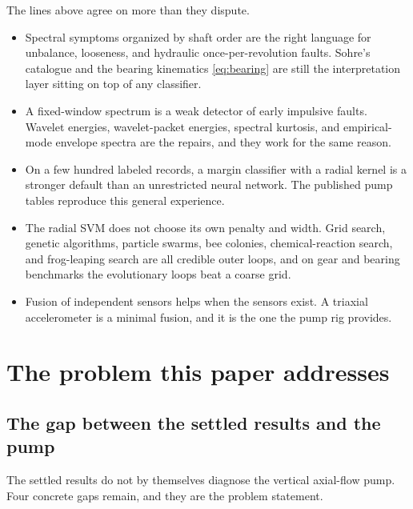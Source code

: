 The lines above agree on more than they dispute.

\begin{itemize}
\item Spectral symptoms organized by shaft order are the right language for unbalance, looseness, and hydraulic once-per-revolution faults.
Sohre's catalogue and the bearing kinematics \eqref{eq:bearing} are still the interpretation layer sitting on top of any classifier.
\item A fixed-window spectrum is a weak detector of early impulsive faults.
Wavelet energies, wavelet-packet energies, spectral kurtosis, and empirical-mode envelope spectra are the repairs, and they work for the same reason.
\item On a few hundred labeled records, a margin classifier with a radial kernel is a stronger default than an unrestricted neural network.
The published pump tables reproduce this general experience.
\item The radial SVM does not choose its own penalty and width.
Grid search, genetic algorithms, particle swarms, bee colonies, chemical-reaction search, and frog-leaping search are all credible outer loops, and on gear and bearing benchmarks the evolutionary loops beat a coarse grid.
\item Fusion of independent sensors helps when the sensors exist.
A triaxial accelerometer is a minimal fusion, and it is the one the pump rig provides.
\end{itemize}

\section{The problem this paper addresses}
\label{sec:problem}

\subsection{The gap between the settled results and the pump}

The settled results do not by themselves diagnose the vertical axial-flow pump.
Four concrete gaps remain, and they are the problem statement.

